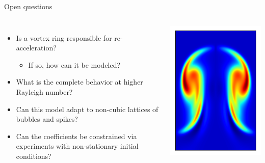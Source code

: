 \documentclass[12pt]{beamer}
\begin{document}
\begin{frame}{Open questions}
\begin{columns}[c] 
\begin{itemize}
  \item Is a vortex ring responsible for re-acceleration?
  \begin{itemize}
    \item If so, how can it be modeled?
  \end{itemize}
  
  \item What is the complete behavior at higher Rayleigh number?

  \item Can this model adapt to non-cubic lattices of bubbles and spikes?

  \item Can the coefficients be constrained via experiments with non-stationary initial conditions?
\end{itemize}

\includegraphics[width=\columnwidth]{graphics/slice_vorticity.png}
\end{columns}
\end{frame}
\end{document}
